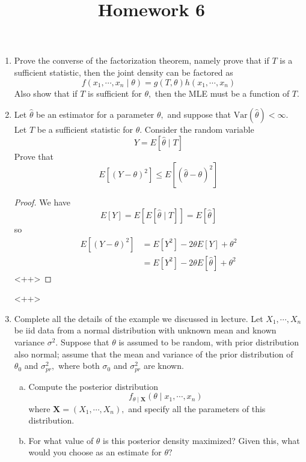 \documentclass{article}
\newcommand{\var}{\mathrm{Var}}
\begin{document}
\title{Homework 6}
\maketitle
\thispagestyle{fancy}

\begin{enumerate}
	\item Prove the converse of the factorization theorem, namely prove that if $T$ is a sufficient statistic, then the joint density can be factored as \[f(x_1, \cdots, x_n\mid\theta)=g(T, \theta)h(x_1, \cdots, x_n)\] Also show that if $T$ is sufficient for $\theta,$ then the MLE must be a function of $T.$

	\item Let $\hat{\theta}$ be an estimator for a parameter $\theta,$ and suppose that $\var(\hat{\theta})<\infty.$ Let $T$ be a sufficient statistic for $\theta.$ Consider the random variable \[Y=E[\hat{\theta}\mid T]\] Prove that \[E\left[ \left( Y-\theta \right)^2 \right]\le E\left[ \left( \hat{\theta}-\theta \right)^2 \right]\]
		\begin{proof}
			We have \[E[Y]=E\left[ E[\hat{\theta}\mid T] \right] = E[\hat{\theta}]\] so
			\begin{align*}
				E\left[ (Y-\theta)^2 \right] &= E[Y^2]-2\theta E[Y] + \theta^2 \\
				&= E[Y^2] - 2\theta E[\hat{\theta}]+\theta^2
			\end{align*}<++>
		\end{proof}<++>

	\item Complete all the details of the example we discussed in lecture. Let $X_1, \cdots, X_n$ be iid data from a normal distribution with unknown mean and known variance $\sigma^2.$ Suppose that $\theta$ is assumed to be random, with prior distribution also normal; assume that the mean and variance of the prior distribution of $\theta_0$ and $\sigma_{pr}^2,$ where both $\sigma_0$ and $\sigma_{pr}^2$ are known.

		\begin{enumerate}[(a)]
			\item Compute the posterior distribution \[f_{\theta\mid\bm{X}} (\theta\mid x_1, \cdots, x_n)\] where $\bm{X}=(X_1, \cdots, X_n),$ and specify all the parameters of this distribution.

			\item For what value of $\theta$ is this posterior density maximized? Given this, what would you choose as an estimate for $\theta?$


\end{enumerate}
\end{enumerate}
\end{document}
